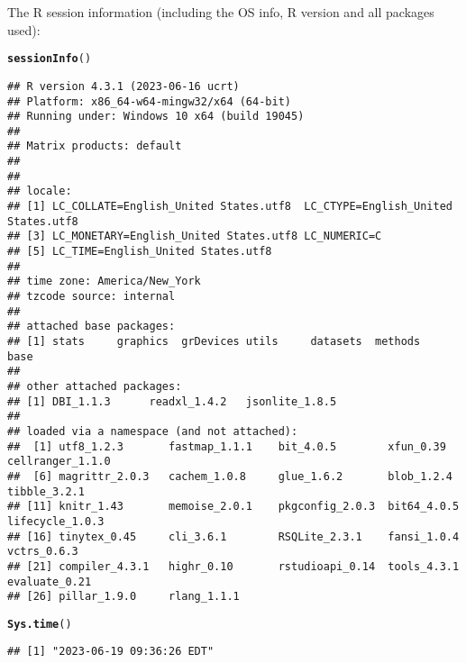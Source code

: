 \documentclass{article}\usepackage[]{graphicx}\usepackage[]{xcolor}
\makeatletter
\newcommand{\hlstd}[1]{\textcolor[rgb]{0.345,0.345,0.345}{#1}}%
\newcommand{\hlkwd}[1]{\textcolor[rgb]{0.737,0.353,0.396}{\textbf{#1}}}%
\newenvironment{kframe}{%
 \def\at@end@of@kframe{}%
 \ifinner\ifhmode%
  \def\at@end@of@kframe{\end{minipage}}%
  \begin{minipage}{\columnwidth}%
 \fi\fi%
 \def\FrameCommand##1{\hskip\@totalleftmargin \hskip-\fboxsep
 \colorbox{shadecolor}{##1}\hskip-\fboxsep
     \hskip-\linewidth \hskip-\@totalleftmargin \hskip\columnwidth}%
 \MakeFramed {\advance\hsize-\width
   \@totalleftmargin\z@ \linewidth\hsize
   \@setminipage}}%
 {\par\unskip\endMakeFramed%
 \at@end@of@kframe}
\newenvironment{knitrout}{}{} %
\makeatother
\begin{document}
The R session information (including the OS info, R version and all
packages used):

\begin{knitrout}
\color{fgcolor}\begin{kframe}
\begin{alltt}
\hlkwd{sessionInfo}\hlstd{()}
\end{alltt}
\begin{verbatim}
## R version 4.3.1 (2023-06-16 ucrt)
## Platform: x86_64-w64-mingw32/x64 (64-bit)
## Running under: Windows 10 x64 (build 19045)
## 
## Matrix products: default
## 
## 
## locale:
## [1] LC_COLLATE=English_United States.utf8  LC_CTYPE=English_United States.utf8   
## [3] LC_MONETARY=English_United States.utf8 LC_NUMERIC=C                          
## [5] LC_TIME=English_United States.utf8    
## 
## time zone: America/New_York
## tzcode source: internal
## 
## attached base packages:
## [1] stats     graphics  grDevices utils     datasets  methods   base     
## 
## other attached packages:
## [1] DBI_1.1.3      readxl_1.4.2   jsonlite_1.8.5
## 
## loaded via a namespace (and not attached):
##  [1] utf8_1.2.3       fastmap_1.1.1    bit_4.0.5        xfun_0.39        cellranger_1.1.0
##  [6] magrittr_2.0.3   cachem_1.0.8     glue_1.6.2       blob_1.2.4       tibble_3.2.1    
## [11] knitr_1.43       memoise_2.0.1    pkgconfig_2.0.3  bit64_4.0.5      lifecycle_1.0.3 
## [16] tinytex_0.45     cli_3.6.1        RSQLite_2.3.1    fansi_1.0.4      vctrs_0.6.3     
## [21] compiler_4.3.1   highr_0.10       rstudioapi_0.14  tools_4.3.1      evaluate_0.21   
## [26] pillar_1.9.0     rlang_1.1.1
\end{verbatim}
\begin{alltt}
\hlkwd{Sys.time}\hlstd{()}
\end{alltt}
\begin{verbatim}
## [1] "2023-06-19 09:36:26 EDT"
\end{verbatim}
\end{kframe}
\end{knitrout}
\end{document}
